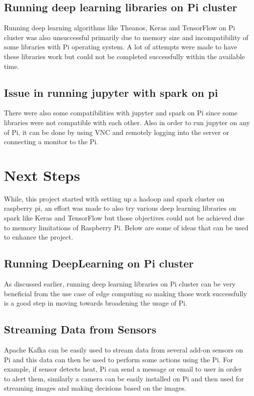 \subsection{Running deep learning libraries on Pi cluster}

Running deep learning algorithms like Theanos, Keras and TensorFlow on
Pi cluster was also unsuccessful primarily due to memory size and
incompatibility of some libraries with Pi operating system. A lot of
attempts were made to have these libraries work but could not be
completed successfully within the available time.

\subsection{Issue in running jupyter with spark on pi}

There were also some compatibilities with jupyter and spark on Pi
since some libraries were not compatible with each other. Also in
order to run jupyter on any of Pi, it can be done by using VNC and
remotely logging into the server or connecting a monitor to the Pi.

\section{Next Steps}

While, this project started with setting up a hadoop and spark cluster
on raspberry pi, an effort was made to also try various deep learning
libraries on spark like Keras and TensorFlow but those objectives could 
not be achieved due to memory limitations of Raspberry Pi. Below are 
some of ideas that can be used to enhance the project.

\subsection{Running DeepLearning on Pi cluster}

As discussed earlier, running deep learning libraries on Pi cluster
can be very beneficial from the use case of edge computing so making
those work successfully is a good step in moving towards broadening
the usage of Pi.

\subsection{Streaming Data from Sensors}
Apache Kafka can be easily used to stream data from several add-on sensors 
on Pi and this data can then be used to perform some actions using the Pi.
For example, if sensor detects heat, Pi can send a message or email to user
in order to alert them, similarly a camera can be easily installed on Pi
and then used for streaming images and making decisions based on the images.

